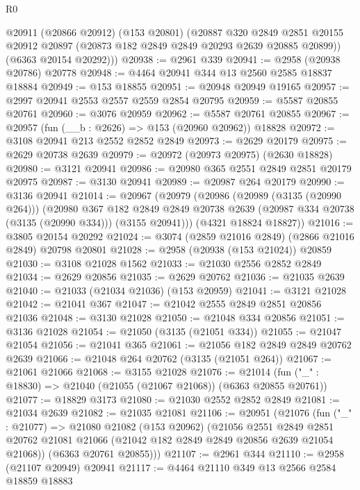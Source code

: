 \begin{lexlean}{R0}
\begin{coremodule}
      @20911
        (@20866 @20912)
        (@153 @20801)
        (@20887
          @320
          @2849
          @2851
          @20155
          @20912
          @20897
          (@20873 @182 @2849 @2849 @20293 @2639 @20885 @20899))
        (@6363 @20154 @20292)))
@20938 := @2961 @339
@20941 := @2958 (@20938 @20786) @20778
@20948 := @4464 @20941 @344 @13 @2560 @2585 @18837 @18884
@20949 := @153 @18855
@20951 := @20948 @20949 @19165
@20957 := @2997 @20941 @2553 @2557 @2559 @2854 @20795
@20959 := @5587 @20855 @20761
@20960 := @3076 @20959
@20962 := @5587 @20761 @20855
@20967 := @20957 (fun (__b : @2626) => @153 (@20960 @20962)) @18828
@20972 := @3108 @20941 @213 @2552 @2852 @2849
@20973 := @2629 @20179
@20975 := @2629 @20738 @2639
@20979 := @20972 (@20973 @20975) (@2630 @18828)
@20980 := @3121 @20941
@20986 := @20980 @365 @2551 @2849 @2851 @20179 @20975
@20987 := @3130 @20941
@20989 := @20987 @264 @20179
@20990 := @3136 @20941
@21014 := @20967
    (@20979
      (@20986
        (@20989 (@3135 (@20990 @264)))
        (@20980
          @367
          @182
          @2849
          @2849
          @20738
          @2639
          (@20987 @334 @20738 (@3135 (@20990 @334)))
          (@3155 @20941)))
      (@4321 @18824 @18827))
@21016 := @3805 @20154 @20292
@21024 := @3074 (@2859 @21016 @2849) (@2866 @21016 @2849) @20798 @20801
@21028 := @2958 (@20938 (@153 @21024)) @20859
@21030 := @3108 @21028 @1562
@21033 := @21030 @2556 @2852 @2849
@21034 := @2629 @20856
@21035 := @2629 @20762
@21036 := @21035 @2639
@21040 := @21033 (@21034 @21036) (@153 @20959)
@21041 := @3121 @21028
@21042 := @21041 @367
@21047 := @21042 @2555 @2849 @2851 @20856 @21036
@21048 := @3130 @21028
@21050 := @21048 @334 @20856
@21051 := @3136 @21028
@21054 := @21050 (@3135 (@21051 @334))
@21055 := @21047 @21054
@21056 := @21041 @365
@21061 := @21056 @182 @2849 @2849 @20762 @2639
@21066 := @21048 @264 @20762 (@3135 (@21051 @264))
@21067 := @21061 @21066
@21068 := @3155 @21028
@21076 := @21014 (fun ("_" : @18830) => @21040 (@21055 (@21067 @21068)) (@6363 @20855 @20761))
@21077 := @18829 @3173
@21080 := @21030 @2552 @2852 @2849
@21081 := @21034 @2639
@21082 := @21035 @21081
@21106 := @20951
    (@21076
      (fun ("_" : @21077) =>
      @21080
        @21082
        (@153 @20962)
        (@21056
          @2551
          @2849
          @2851
          @20762
          @21081
          @21066
          (@21042 @182 @2849 @2849 @20856 @2639 @21054 @21068))
        (@6363 @20761 @20855)))
@21107 := @2961 @344
@21110 := @2958 (@21107 @20949) @20941
@21117 := @4464 @21110 @349 @13 @2566 @2584 @18859 @18883

\end{coremodule}
\end{lexlean}
